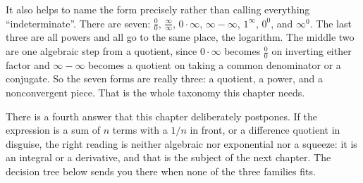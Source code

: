 It also helps to name the form precisely rather than calling everything ``indeterminate''. There are seven: $\tfrac00$, $\tfrac{\infty}{\infty}$, $0\cdot\infty$, $\infty-\infty$, $1^{\infty}$, $0^{0}$, and $\infty^{0}$. The last three are all powers and all go to the same place, the logarithm. The middle two are one algebraic step from a quotient, since $0\cdot\infty$ becomes $\tfrac00$ on inverting either factor and $\infty-\infty$ becomes a quotient on taking a common denominator or a conjugate. So the seven forms are really three: a quotient, a power, and a nonconvergent piece. That is the whole taxonomy this chapter needs.

There is a fourth answer that this chapter deliberately postpones. If the expression is a sum of $n$ terms with a $1/n$ in front, or a difference quotient in disguise, the right reading is neither algebraic nor exponential nor a squeeze: it is an integral or a derivative, and that is the subject of the next chapter. The decision tree below sends you there when none of the three families fits.

\begin{center}
\end{center}

